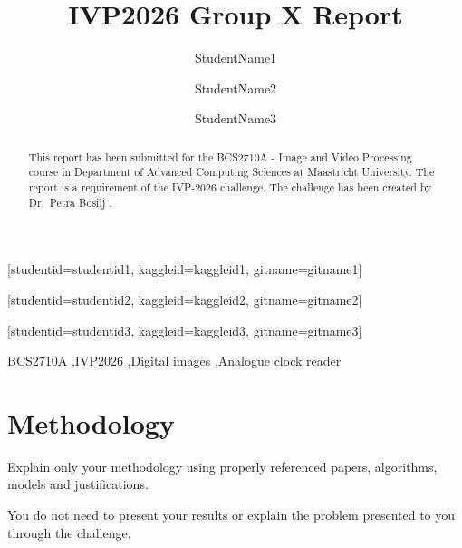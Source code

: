 \documentclass[a4paper,fleqn]{cas-sc}
\begin{document}
\graphicspath{{./}}


\title [mode = title]{IVP2026 Group X Report}

\author[1]{StudentName1}[studentid=studentid1, kaggleid=kaggleid1, gitname=gitname1]
\author[1]{StudentName2}[studentid=studentid2, kaggleid=kaggleid2, gitname=gitname2]
\author[1]{StudentName3}[studentid=studentid3, kaggleid=kaggleid3, gitname=gitname3]


\begin{abstract}
This report has been submitted for the BCS2710A - Image and Video Processing course in Department of Advanced Computing Sciences at Maastricht University. The report is a requirement of the IVP-2026 challenge. The challenge has been created by Dr.\@~Petra Bosilj \citep{the_challenge}.
\end{abstract}

\begin{keywords}
BCS2710A \sep IVP2026 \sep Digital images \sep Analogue clock reader 
\end{keywords}
\maketitle 
\clearpage

\section{Methodology}
Explain only your methodology using properly referenced papers, algorithms, models and justifications.

You do not need to present your results or explain the problem presented to you through the challenge.
\end{document}
